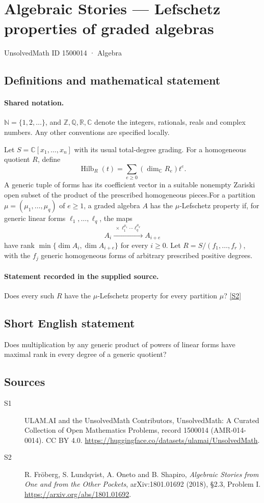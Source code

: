 \documentclass[11pt]{article}
\newcommand{\sref}[2]{\hyperlink{source:#1:#2}{[S#2]}}
\begin{document}
\setcounter{section}{1500013}
\section{Algebraic Stories — Lefschetz properties of graded algebras}\label{1500014}
{\small\sffamily UnsolvedMath ID 1500014 · Algebra}
\subsection{Definitions and mathematical statement}

\paragraph{Shared notation.}$\mathbb N=\{1,2,\ldots\}$, and $\mathbb Z,\mathbb Q,\mathbb R,\mathbb C$ denote the integers, rationals, reals and complex numbers. Any other conventions are specified locally.


Let $S=\mathbb C[x_1,\ldots,x_n]$ with its usual total-degree grading. For a homogeneous quotient $R$, define
\[\operatorname{Hilb}_R(t)=\sum_{e\geq0}(\dim_{\mathbb C}R_e)t^e.
\]
A generic tuple of forms has its coefficient vector in a suitable nonempty Zariski open subset of the product of the prescribed homogeneous pieces.For a partition $\mu=(\mu_1,\ldots,\mu_q)$ of $e\geq1$, a graded algebra $A$ has the $\mu$-Lefschetz property if, for generic linear forms $\ell_1,\ldots,\ell_q$, the maps
\[A_i\xrightarrow{\ \times\ell_1^{\mu_1}\cdots\ell_q^{\mu_q}\ } A_{i+e}
\]
have rank $\min\{\dim A_i,\dim A_{i+e}\}$ for every $i\geq0$. Let $R=S/(f_1,\ldots,f_r)$, with the $f_j$ generic homogeneous forms of arbitrary prescribed positive degrees.
\paragraph{Statement recorded in the supplied source.}
Does every such $R$ have the $\mu$-Lefschetz property for every partition $\mu$? \sref{1500014}{2}
\subsection{Short English statement}
Does multiplication by any generic product of powers of linear forms have maximal rank in every degree of a generic quotient?
\subsection{Sources}
\begin{description}
\item[\hypertarget{source:1500014:1}{S1}] ULAM.AI and the UnsolvedMath Contributors, UnsolvedMath: A Curated Collection of Open Mathematics Problems, record 1500014 (AMR-014-0014). CC BY 4.0. \url{https://huggingface.co/datasets/ulamai/UnsolvedMath}.
\item[\hypertarget{source:1500014:2}{S2}] R. Fröberg, S. Lundqvist, A. Oneto and B. Shapiro, \emph{Algebraic Stories from One and from the Other Pockets}, arXiv:1801.01692 (2018), §2.3, Problem I. \url{https://arxiv.org/abs/1801.01692}.
\end{description}
\label{end:1500014}
\end{document}

